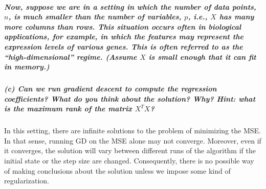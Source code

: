 \documentclass[11pt, english]{article}
\begin{document}
    \hypertarget{now-suppose-we-are-in-a-setting-in-which-the-number-of-data-points-n-is-much-smaller-than-the-number-of-variables-p-i.e.-x-has-many-more-columns-than-rows.-this-situation-occurs-often-in-biological-applications-for-example-in-which-the-features-may-represent-the-expression-levels-of-various-genes.-this-is-often-referred-to-as-the-high-dimensional-regime.-assume-x-is-small-enough-that-it-can-fit-in-memory.}{%
\subparagraph{\texorpdfstring{Now, suppose we are in a setting in which
the number of data points, \(n\), is much smaller than the number of
variables, \(p\), i.e., \(X\) has many more columns than rows. This
situation occurs often in biological applications, for example, in which
the features may represent the expression levels of various genes. This
is often referred to as the ``high-dimensional'' regime. (Assume \(X\)
is small enough that it can fit in
memory.)}{Now, suppose we are in a setting in which the number of data points, n, is much smaller than the number of variables, p, i.e., X has many more columns than rows. This situation occurs often in biological applications, for example, in which the features may represent the expression levels of various genes. This is often referred to as the ``high-dimensional'' regime. (Assume X is small enough that it can fit in memory.)}}\label{now-suppose-we-are-in-a-setting-in-which-the-number-of-data-points-n-is-much-smaller-than-the-number-of-variables-p-i.e.-x-has-many-more-columns-than-rows.-this-situation-occurs-often-in-biological-applications-for-example-in-which-the-features-may-represent-the-expression-levels-of-various-genes.-this-is-often-referred-to-as-the-high-dimensional-regime.-assume-x-is-small-enough-that-it-can-fit-in-memory.}}

    \hypertarget{c-can-we-run-gradient-descent-to-compute-the-regression-coefficients-what-do-you-think-about-the-solution-why-hint-what-is-the-maximum-rank-of-the-matrix-xt-x}{%
\subparagraph{\texorpdfstring{(c) Can we run gradient descent to compute
the regression coefficients? What do you think about the solution? Why?
\emph{Hint: what is the maximum rank of the matrix
\(X^T X\)?\\[2ex]}}{(c) Can we run gradient descent to compute the regression coefficients? What do you think about the solution? Why? Hint: what is the maximum rank of the matrix X\^{}T X?}}\label{c-can-we-run-gradient-descent-to-compute-the-regression-coefficients-what-do-you-think-about-the-solution-why-hint-what-is-the-maximum-rank-of-the-matrix-xt-x}}

    In this setting, there are infinite solutions to the problem of
minimizing the MSE. In that sense, running GD on the MSE alone may not
converge. Moreover, even if it converges, the solution will vary between
different runs of the algorithm if the initial state or the step size
are changed. Consequently, there is no possible way of making
conclusions about the solution unless we impose some kind of
regularization.
\end{document}
